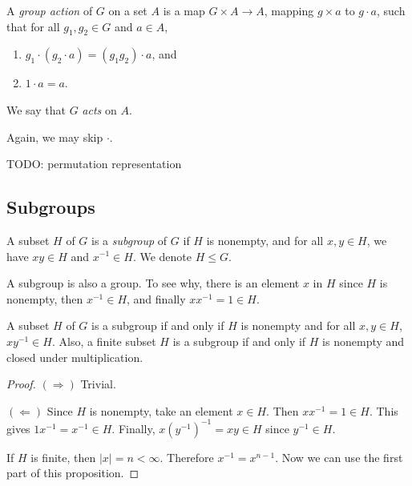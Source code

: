     \begin{defn} \label{def_group_action}
        A \emph{group action} of $G$ on a set $A$ is a map $G \times A \to A$, mapping $g \times a$ to $g \cdot a$, such that for all $g_1,g_2 \in G$ and $a \in A$, \begin{enumerate}
            \item $g_1 \cdot (g_2 \cdot a) = (g_1g_2) \cdot a$, and
            \item $1 \cdot a = a$.
        \end{enumerate}
        We say that $G$ \emph{acts} on $A$.
    \end{defn}
    
    Again, we may skip $\cdot$.
    
    TODO: permutation representation
    
    \subsection{Subgroups}
    
    \begin{defn}[Subgroups] \label{def_subgroup}
        A subset $H$ of $G$ is a \emph{subgroup} of $G$ if $H$ is nonempty, and for all $x,y \in H$, we have $xy \in H$ and $x^{-1} \in H$. We denote $H \leq G$.
    \end{defn}
    
    A subgroup is also a group. To see why, there is an element $x$ in $H$ since $H$ is nonempty, then $x^{-1} \in H$, and finally $x x^{-1} = 1 \in H$.
    
    \begin{prop} \label{prop_subgroup_criterion}
        A subset $H$ of $G$ is a subgroup if and only if $H$ is nonempty and for all $x,y \in H$, $x y^{-1} \in H$. Also, a finite subset $H$ is a subgroup if and only if $H$ is nonempty and closed under multiplication.
    \end{prop}
    
    \begin{proof}
        $(\Rightarrow)$ Trivial.
        
        $(\Leftarrow)$ Since $H$ is nonempty, take an element $x \in H$. Then $x x^{-1} = 1 \in H$. This gives $1 x^{-1} = x^{-1} \in H$. Finally, $x (y^{-1})^{-1} = xy \in H$ since $y^{-1} \in H$.
        
        If $H$ is finite, then $|x|=n<\infty$. Therefore $x^{-1} = x^{n-1}$. Now we can use the first part of this proposition.
    \end{proof}
    
